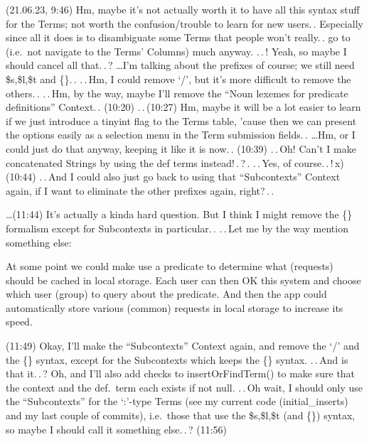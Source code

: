 \documentclass{report}
\begin{document}
(21.06.23, 9:46) Hm, maybe it's not actually worth it to have all this syntax stuff for the Terms; not worth the confusion/trouble to learn for new users.\,. Especially since all it does is to disambiguate some Terms that people won't really.\,. go to (i.e.\ not navigate to the Terms' Columns) much anyway. .\,.\,! Yeah, so maybe I should cancel all that.\,.\,? \ldots I'm talking about the prefixes of course; we still need \$s,\$l,\$t and \{\}.\,. .\,.\,Hm, I could remove `/', but it's more difficult to remove the others.\,. .\,.\,Hm, by the way, maybe I'll remove the ``Noun lexemes for predicate definitions'' Context.\,. (10:20) .\,.\,(10:27) Hm, maybe it will be a lot easier to learn if we just introduce a tinyint flag to the Terms table, 'cause then we can present the options easily as a selection menu in the Term submission fields.\,. \ldots Hm, or I could just do that anyway, keeping it like it is now.\,. (10:39) .\,.\,Oh! Can't I make concatenated Strings by using the def terms instead!\,.\,?\,. .\,.\,Yes, of course.\,.\,!\,x) (10:44) .\,.\,And I could also just go back to using that ``Subcontexts'' Context again, if I want to eliminate the other prefixes again, right?\,.\,.

\ldots (11:44) It's actually a kinda hard question. But I think I might remove the \{\} formalism except for Subcontexts in particular.\,. .\,.\,Let me by the way mention something else:

At some point we could make use a predicate to determine what (requests) should be cached in local storage. Each user can then OK this system and choose which user (group) to query about the predicate. And then the app could automatically store various (common) requests in local storage to increase its speed.

(11:49) Okay, I'll make the ``Subcontexts'' Context again, and remove the `/' and the \{\} syntax, except for the Subcontexts which keeps the \{\} syntax. .\,.\,And is that it.\,.\,? Oh, and I'll also add checks to insertOrFindTerm() to make sure that the context and the def.\ term each exists if not null. .\,.\,Oh wait, I should only use the ``Subcontexts'' for the `:'-type Terms (see my current code (initial\_inserts) and my last couple of commits), i.e.\ those that use the \$s,\$l,\$t (and \{\}) syntax, so maybe I should call it something else.\,.\,? (11:56)
\end{document}
